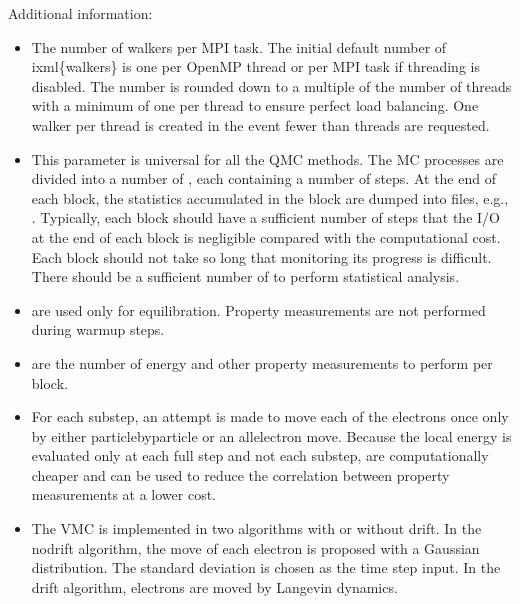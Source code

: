 \documentclass[letterpaper,10pt,english]{sphinxmanual}
\begin{document}
Additional information:
\begin{itemize}
\item {} 
 The number of walkers per MPI task. The initial default number of ixml\{walkers\} is one per OpenMP thread or per MPI task if threading is disabled. The number is rounded down to a multiple of the number of threads with a minimum of one per thread to ensure perfect load balancing. One walker per thread is created in the event fewer  than threads are requested.

\item {} 
 This parameter is universal for all the QMC
methods. The MC processes are divided into a number of
, each containing a number of steps. At the end of each block,
the statistics accumulated in the block are dumped into files,
e.g., . Typically, each block should have a sufficient number of steps that the I/O at the end of each block is negligible
compared with the computational cost. Each block should not take so
long that monitoring its progress is difficult. There should be a
sufficient number of  to perform statistical analysis.

\item {} 
 \sphinxhyphen{}  are used only for
equilibration. Property measurements are not performed during
warm\sphinxhyphen{}up steps.

\item {} 
 \sphinxhyphen{}  are the number of energy and other property measurements to perform per block.

\item {} 
  For each substep, an attempt is made to move each of the electrons once only by either particle\sphinxhyphen{}by\sphinxhyphen{}particle or an
all\sphinxhyphen{}electron move.  Because the local energy is evaluated only at
each full step and not each substep,  are computationally cheaper
and can be used to reduce the correlation between property measurements
at a lower cost.

\item {} 
 The VMC is implemented in two algorithms with
or without drift. In the no\sphinxhyphen{}drift algorithm, the move of each
electron is proposed with a Gaussian distribution. The standard
deviation is chosen as the time step input. In the drift algorithm,
electrons are moved by Langevin dynamics.


\end{itemize}
\end{document}
